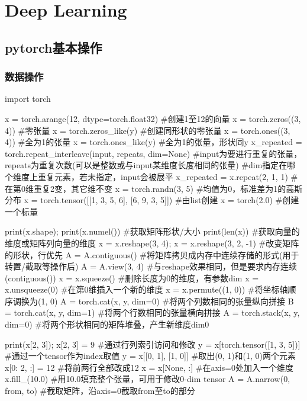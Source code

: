 \section{Deep Learning}

  \subsection{pytorch基本操作}
    \subsubsection{数据操作}
      \begin{codeblock}[language=python, caption={basic manipulation}]
        import torch

        x = torch.arange(12, dtype=torch.float32) #创建1至12的向量
        x = torch.zeros((3, 4)) #零张量
        x = torch.zeros_like(y) #创建同形状的零张量
        x = torch.ones((3, 4)) #全为1的张量
        x = torch.ones_like(y) #全为1的张量，形状同y
        x_repeated = torch.repeat_interleave(input, repeats, dim=None)
            #input为要进行重复的张量，repeats为重复次数(可以是整数或与input某维度长度相同的张量)
            #dim指定在哪个维度上重复元素，若未指定，input会被展平
        x_repeated = x.repeat(2, 1, 1) #在第0维重复2变，其它维不变
        x = torch.randn(3, 5) #均值为0，标准差为1的高斯分布 
        x = torch.tensor([[1, 3, 5, 6], [6, 9, 3, 5]]) #由list创建
        x = torch(2.0) #创建一个标量

        print(x.shape); print(x.numel()) #获取矩阵形状/大小
        print(len(x)) #获取向量的维度或矩阵列向量的维度
        x = x.reshape(3, 4); x = x.reshape(3, 2, -1) #改变矩阵的形状，行优先
        A = A.contiguous() #将矩阵拷贝成内存中连续存储的形式(用于转置/截取等操作后)
        A = A.view(3, 4) #与reshape效果相同，但是要求内存连续(contiguous())
        x = x.squeeze() #删除长度为0的维度，有参数dim
        x = x.unsqueeze(0) #在第0维插入一个新的维度
        x = x.permute((1, 0)) #将坐标轴顺序调换为(1, 0)
        A = torch.cat(x, y, dim=0) #将两个列数相同的张量纵向拼接
        B = torch.cat(x, y, dim=1) #将两个行数相同的张量横向拼接
        A = torch.stack(x, y, dim=0) #将两个形状相同的矩阵堆叠，产生新维度dim0

        print(x[2, 3]); x[2, 3] = 9 #通过行列索引访问和修改
        y = x[torch.tensor([1, 3, 5])] #通过一个tensor作为index取值
        y = x[[0, 1], [1, 0]] #取出(0, 1)和(1, 0)两个元素
        x[0: 2, :] = 12 #将前两行全部改成12
        x = x[None, :] #在axis=0处加入一个维度
        x.fill_(10.0) #用10.0填充整个张量，可用于修改0-dim tensor
        A = A.narrow(0, from, to) #截取矩阵，沿axis=0截取from至to的部分


\end{codeblock}
